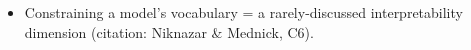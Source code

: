 \begin{itemize}
    \item Constraining a model's vocabulary = a rarely-discussed interpretability dimension (citation: Niknazar \& Mednick, C6). 

\end{itemize}
